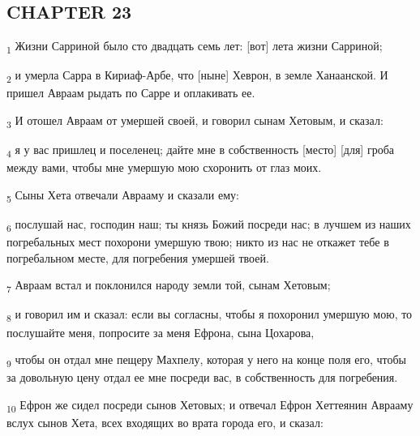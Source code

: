 \subsection{CHAPTER 23}
\begin{tcolorbox}
\textsubscript{1} Жизни Сарриной было сто двадцать семь лет: [вот] лета жизни Сарриной;
\end{tcolorbox}
\begin{tcolorbox}
\textsubscript{2} и умерла Сарра в Кириаф-Арбе, что [ныне] Хеврон, в земле Ханаанской. И пришел Авраам рыдать по Сарре и оплакивать ее.
\end{tcolorbox}
\begin{tcolorbox}
\textsubscript{3} И отошел Авраам от умершей своей, и говорил сынам Хетовым, и сказал:
\end{tcolorbox}
\begin{tcolorbox}
\textsubscript{4} я у вас пришлец и поселенец; дайте мне в собственность [место] [для] гроба между вами, чтобы мне умершую мою схоронить от глаз моих.
\end{tcolorbox}
\begin{tcolorbox}
\textsubscript{5} Сыны Хета отвечали Аврааму и сказали ему:
\end{tcolorbox}
\begin{tcolorbox}
\textsubscript{6} послушай нас, господин наш; ты князь Божий посреди нас; в лучшем из наших погребальных мест похорони умершую твою; никто из нас не откажет тебе в погребальном месте, для погребения умершей твоей.
\end{tcolorbox}
\begin{tcolorbox}
\textsubscript{7} Авраам встал и поклонился народу земли той, сынам Хетовым;
\end{tcolorbox}
\begin{tcolorbox}
\textsubscript{8} и говорил им и сказал: если вы согласны, чтобы я похоронил умершую мою, то послушайте меня, попросите за меня Ефрона, сына Цохарова,
\end{tcolorbox}
\begin{tcolorbox}
\textsubscript{9} чтобы он отдал мне пещеру Махпелу, которая у него на конце поля его, чтобы за довольную цену отдал ее мне посреди вас, в собственность для погребения.
\end{tcolorbox}
\begin{tcolorbox}
\textsubscript{10} Ефрон же сидел посреди сынов Хетовых; и отвечал Ефрон Хеттеянин Аврааму вслух сынов Хета, всех входящих во врата города его, и сказал:
\end{tcolorbox}
